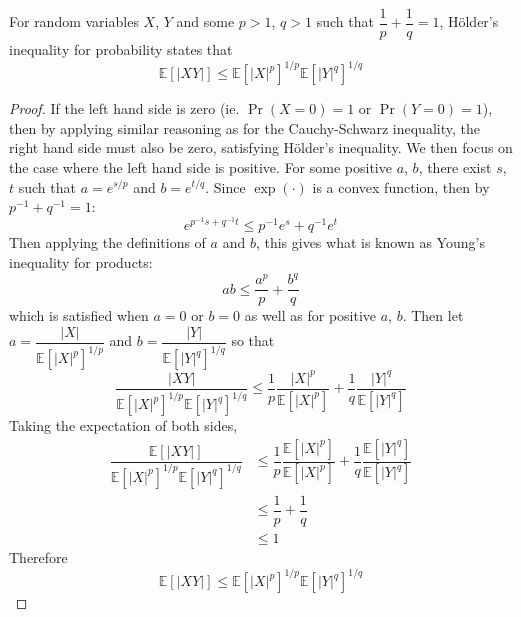 \documentclass[11pt]{report} %
\begin{document}
For random variables $X$, $Y$ and some $p > 1$, $q > 1$ such that $\dfrac{1}{p} + \dfrac{1}{q} = 1$, H\"{o}lder's inequality for probability states that
\begin{equation}
\mathbb{E}\left[\left|XY\right|\right]\leq\mathbb{E}\left[\left|X\right|^{p}\right]^{1/p}\mathbb{E}\left[\left|Y\right|^{q}\right]^{1/q}
\end{equation}
\begin{proof}
If the left hand side is zero (ie. $\operatorname{Pr}\left(X = 0\right) = 1$ or $\operatorname{Pr}\left(Y = 0\right) = 1$), then by applying similar reasoning as for the Cauchy-Schwarz inequality, the right hand side must also be zero, satisfying H\"{o}lder's inequality. We then focus on the case where the left hand side is positive. For some positive $a$, $b$, there exist $s$, $t$ such that $a = e^{s/p}$ and $b = e^{t/q}$. Since $\exp\left(\cdot\right)$ is a convex function, then by $p^{-1} + q^{-1} = 1$:
\begin{equation}
e^{p^{-1}s + q^{-1}t} \leq p^{-1}e^{s} + q^{-1}e^{t}
\end{equation}
Then applying the definitions of $a$ and $b$, this gives what is known as Young's inequality for products:
\begin{equation}
ab \leq \dfrac{a^{p}}{p} + \dfrac{b^{q}}{q}
\end{equation}
which is satisfied when $a = 0$ or $b = 0$ as well as for positive $a$, $b$. Then let $a = \dfrac{\left|X\right|}{\mathbb{E}\left[\left|X\right|^{p}\right]^{1/p}}$ and $b = \dfrac{\left|Y\right|}{\mathbb{E}\left[\left|Y\right|^{q}\right]^{1/q}}$ so that
\begin{equation}
\dfrac{\left|XY\right|}{\mathbb{E}\left[\left|X\right|^{p}\right]^{1/p}\mathbb{E}\left[\left|Y\right|^{q}\right]^{1/q}}\leq\dfrac{1}{p}\dfrac{\left|X\right|^{p}}{\mathbb{E}\left[\left|X\right|^{p}\right]}+\dfrac{1}{q}\dfrac{\left|Y\right|^{q}}{\mathbb{E}\left[\left|Y\right|^{q}\right]}
\end{equation}
Taking the expectation of both sides,
\begin{align}
\dfrac{\mathbb{E}\left[\left|XY\right|\right]}{\mathbb{E}\left[\left|X\right|^{p}\right]^{1/p}\mathbb{E}\left[\left|Y\right|^{q}\right]^{1/q}} &\leq \dfrac{1}{p}\dfrac{\mathbb{E}\left[\left|X\right|^{p}\right]}{\mathbb{E}\left[\left|X\right|^{p}\right]}+\dfrac{1}{q}\dfrac{\mathbb{E}\left[\left|Y\right|^{q}\right]}{\mathbb{E}\left[\left|Y\right|^{q}\right]} \\
&\leq \dfrac{1}{p} + \dfrac{1}{q} \\
&\leq 1
\end{align}
Therefore
\begin{equation}
\mathbb{E}\left[\left|XY\right|\right]\leq\mathbb{E}\left[\left|X\right|^{p}\right]^{1/p}\mathbb{E}\left[\left|Y\right|^{q}\right]^{1/q}
\end{equation}
\end{proof}
\end{document}
